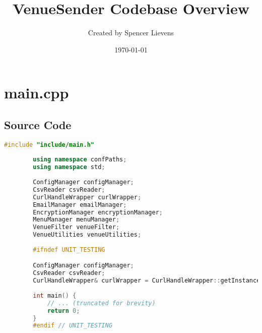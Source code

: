 \documentclass{article}
\title{VenueSender Codebase Overview}
\author{Created by Spencer Lievens}
\date{\today}
\begin{document}
	
	\maketitle
	\tableofcontents
	\newpage
	
	\section{main.cpp}
	
	\subsection*{Source Code}
	\begin{mdframed}[backgroundcolor=background, hidealllines=false, innerleftmargin=15pt, innerrightmargin=5pt, innertopmargin=0pt, innerbottommargin=-5pt, linecolor=accent]
	\begin{lstlisting}[language=C++]
		#include "include/main.h"
		
		using namespace confPaths;
		using namespace std;
		
		ConfigManager configManager;
		CsvReader csvReader;
		CurlHandleWrapper curlWrapper;
		EmailManager emailManager;
		EncryptionManager encryptionManager;
		MenuManager menuManager;
		VenueFilter venueFilter;
		VenueUtilities venueUtilities;
		
		#ifndef UNIT_TESTING

		ConfigManager configManager;
		CsvReader csvReader;
		CurlHandleWrapper& curlWrapper = CurlHandleWrapper::getInstance();
		
		int main() {
			// ... (truncated for brevity)
			return 0;
		}
		#endif // UNIT_TESTING
	\end{lstlisting}
\end{mdframed}
	
\end{document}
